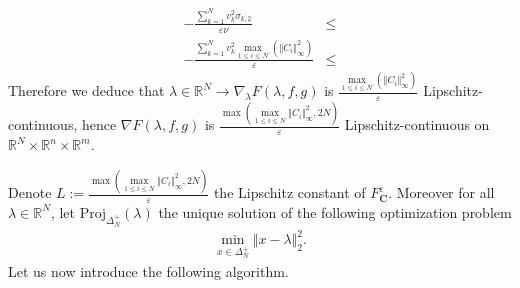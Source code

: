 \begin{prv*}
\begin{align*}
 - \frac{\sum_{k=1}^N v_k^2 \sigma_{k,2}}{\varepsilon\nu}  & \leq \\
  - \frac{\sum_{k=1}^N v_k^2 \max\limits_{1\leq i\leq N}(\Vert C_i\Vert_{\infty}^2) }{\varepsilon}  & \leq 
 \end{align*}
 Therefore we deduce that $\lambda\in\mathbb{R}^N \rightarrow \nabla_{\lambda} F(\lambda,f,g)$ is $\frac{\max\limits_{1\leq i\leq N}(\Vert C_i\Vert_{\infty}^2)}{\varepsilon}$ Lipschitz-continuous, hence $\nabla F(\lambda,f,g)$ is $\frac{\max\left(\max\limits_{1\leq i\leq N}\Vert C_i\Vert_{\infty}^2,2N\right)}{\varepsilon}$ Lipschitz-continuous on $\mathbb{R}^N\times \mathbb{R}^n \times\mathbb{R}^m$. 
\end{prv*}



Denote $L:= \frac{\max\left(\max\limits_{1\leq i\leq N}\Vert C_i\Vert_{\infty}^2,2N\right)}{\varepsilon}$ the  Lipschitz constant of $F_{\mathbf{C}}^{\varepsilon}$. Moreover for all $\lambda\in\mathbb{R}^N$, let $\text{Proj}_{\Delta_N^{+}}(\lambda)$ the unique solution of the following optimization problem
\begin{align}
\label{prob:proj}
    \min_{x\in\Delta_N^{+}} \Vert x - \lambda\Vert_2^2.
\end{align}
Let us now introduce the following algorithm.




